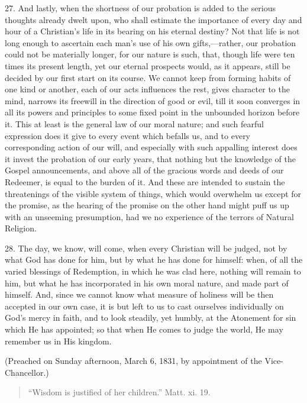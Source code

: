 27. And lastly, when the shortness of our probation is added to the
serious thoughts already dwelt upon, who shall estimate the importance
of every day and hour of a Christian's life in its bearing on his
eternal destiny? Not that life is not long enough to ascertain each
man's use of his own gifts,—rather, our probation could not be
materially longer, for our nature is such, that, though life were ten
times its present length, yet our eternal prospects would, as it
appears, still be decided by our first start on its course. We cannot
keep from forming habits of one kind or another, each of our acts
influences the rest, gives character to the mind, narrows its freewill
in the direction of good or evil, till it soon converges in
all its powers and principles to some fixed point in the unbounded
horizon before it. This at least is the general law of our moral
nature; and such fearful expression does it give to every event which
befalls us, and to every corresponding action of our will, and
especially with such appalling interest does it invest the probation
of our early years, that nothing but the knowledge of the Gospel
announcements, and above all of the gracious words and deeds of our
Redeemer, is equal to the burden of it. And these are intended to
sustain the threatenings of the visible system of things, which would
overwhelm us except for the promise, as the hearing of the promise on
the other hand might puff us up with an unseeming presumption, had we
no experience of the terrors of Natural Religion.

28. The day, we know, will come, when every Christian will be
judged, not by what God has done for him, but by what he has done for
himself: when, of all the varied blessings of Redemption, in which he
was clad here, nothing will remain to him, but what he has
incorporated in his own moral nature, and made part of himself. And,
since we cannot know what measure of holiness will be then accepted in
our own case, it is but left to us to cast ourselves individually on
God's mercy in faith, and to look steadily, yet humbly, at the
Atonement for sin which He has appointed; so that when He comes to
judge the world, He may remember us in His kingdom.

(Preached on Sunday afternoon, March 6, 1831, by appointment of the
Vice-Chancellor.)


\begin{quote}

``Wisdom is justified of her children.'' Matt. xi. 19.

\end{quote}

